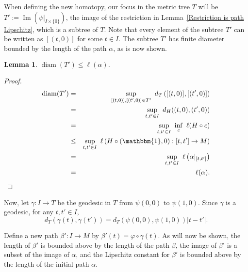 \documentclass{article}
\newtheorem{lemma}[theorem]{Lemma}
\theoremstyle{definition}
\newtheorem{definition}[theorem]{Definition}
\theoremstyle{remark}
\def\deq{:=}
\def\id{\mathbbm{1}}
\DeclareMathOperator{\Ima}{Im}
\newcommand{\length}[1]{\ell}%
\DeclareMathOperator{\diam}{diam}
\begin{document}

When defining the new homotopy, our focus in the metric tree $T$ will be $T'\deq\Ima(\psi|_{I\times\{0\}})$, the image of the restriction in Lemma~\ref{Restriction is path Lipschitz}, which is a subtree of $T$. Note that every element of the subtree $T'$ can be written as $[(t,0)]$ for some $t\in I$. The subtree $T'$ has finite diameter bounded by the length of the path $\alpha$, as is now shown.


\begin{lemma}\label{finite diameter of subtree}
$\diam(T')\leq\length{M}(\alpha)$.
\end{lemma}

\begin{proof}
\begin{eqnarray*}
\diam(T') & = & \sup_{[(t,0)],[(t',0)]\in T'}~d_T\left([(t,0)],[(t',0)]\right) \\
		  & = & \sup_{t,t'\in I}~d_H((t,0),(t',0)) \\
		  & = & \sup_{t,t'\in I}~\inf_{c}~\length{M}(H\circ c) \\
		  & \leq & \sup_{t,t'\in I}~\length{M}\left(H\circ(\id,0):[t,t']\rightarrow M\right) \\
		  & = & \sup_{t,t'\in I}~\length{M}\left(\alpha|_{[t,t']}\right) \\
		  & = & \length{M}(\alpha).
\end{eqnarray*}
\end{proof}


Now, let $\gamma:I\rightarrow T$ be the geodesic in $T$ from $\psi(0,0)$ to $\psi(1,0)$. Since $\gamma$ is a geodesic, for any $t,t'\in I$,
\begin{equation}\label{gamma geodesic property}
d_T(\gamma(t), \gamma(t'))=d_T(\psi(0,0), \psi(1,0)) \left|t-t'\right|.
\end{equation}

Define a new path $\beta':I\rightarrow M$ by $\beta'(t)=\varphi\circ\gamma(t)$. As will now be shown, the length of $\beta'$ is bounded above by the length of the path $\beta$, the image of $\beta'$ is a subset of the image of $\alpha$, and the Lipschitz constant for $\beta'$ is bounded above by the length of the initial path $\alpha$.
\end{document}

